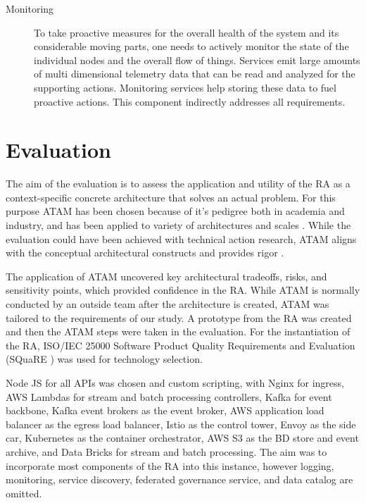 \documentclass[a4paper,11pt]{article}
\let\cite\citep
\begin{document}
\begin{description}
    \item[Monitoring] To take proactive measures for the overall health of the system and its considerable moving parts, one needs to actively monitor the state of the individual nodes and the overall flow of things. Services emit large amounts of multi dimensional telemetry data that can be read and analyzed for the supporting actions. Monitoring services help storing these data to fuel proactive actions. This component indirectly addresses all requirements. 

\end{description}


\section{Evaluation}

The aim of the evaluation is to assess the application and utility of the RA as a context-specific concrete architecture that solves an actual problem. For this purpose ATAM has been chosen because of it's pedigree both in academia and industry, and has been applied to variety of architectures and scales \cite{SoftwareArchitectureKazman}. While the evaluation could have been achieved with technical action research,  ATAM aligns with the conceptual architectural constructs and provides rigor \cite{wieringa2014design}. 

The application of ATAM uncovered key architectural tradeoffs, risks, and sensitivity points, which provided confidence in the RA. While ATAM is normally conducted by an outside team after the architecture is created, ATAM was tailored to the requirements of our study. A prototype from the RA was created and then the ATAM steps were taken in the evaluation. For the instantiation of the RA, ISO/IEC 25000 Software Product Quality Requirements and Evaluation (SQuaRE ) \cite{ISO25000} was used for technology selection. 


Node JS for all APIs was chosen and custom scripting, with Nginx for ingress, AWS Lambdas for stream and batch processing controllers, Kafka for event backbone, Kafka event brokers as the event broker, AWS application load balancer as the egress load balancer, Istio as the control tower, Envoy as the side car, Kubernetes as the container orchestrator, AWS S3 as the BD store and event archive, and Data Bricks for stream and batch processing. The aim was to incorporate most components of the RA into this instance, however logging, monitoring, service discovery, federated governance service, and data catalog are omitted. 
\end{document}
